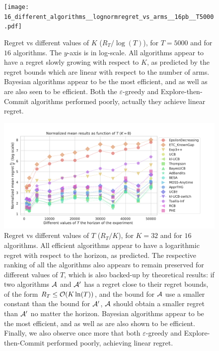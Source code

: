 \begin{figure}[h!]  %
	\texttt{[image: 16\_different\_algorithms\_\_lognormregret\_vs\_arms\_\_16pb\_\_T5000.pdf]}
	\caption[Regret vs different values of $K$.]{
        Regret vs different values of $K$ ($R_T / \log(T)$),
        for $T=5000$ and for $16$ algorithms.
        The $y$-axis is in log-scale.
        All algorithms appear to have a regret slowly growing with respect to $K$, as predicted by the regret bounds which are linear with respect to the number of arms.
        Bayesian algorithms appear to be the most efficient, and \klUCB{} as well as \UCB{} are also seen to be efficient.
        Both the $\varepsilon$-greedy and Explore-then-Commit algorithms performed poorly, actually they achieve linear regret.
	}
	\label{fig:3:16_different_algorithms__lognormregret_vs_arms__16pb__T5000}
\end{figure}

\begin{figure}[h!]  %
	\includegraphics[width=1.10\linewidth]{16_different_algorithms__lognormregret_vs_times__16pb__K8.pdf}
	\caption[Regret vs different values of $T$.]{
        Regret vs different values of $T$ ($R_T / K$),
        for $K=32$ and for $16$ algorithms.
        All efficient algorithms appear to have a logarithmic regret with respect to the horizon, as predicted.
        The respective ranking of all the algorithms also appears to remain preserved for different values of $T$, which is also backed-up by theoretical results: if two algorithms $\mathcal{A}$ and $\mathcal{A}'$ has a regret close to their regret bounds, of the form $R_T \leq \mathcal{O}(K \ln(T))$, and the bound for $\mathcal{A}$ use a smaller constant than the bound for $\mathcal{A}'$, $\mathcal{A}$ should obtain a smaller regret than $\mathcal{A}'$ no matter the horizon.
        Bayesian algorithms appear to be the most efficient, and \klUCB{} as well as \UCB{} are also shown to be efficient.
        Finally, we also observe once more that both $\varepsilon$-greedy and Explore-then-Commit performed poorly, achieving linear regret.
	}
	\label{fig:3:16_different_algorithms__lognormregret_vs_times__16pb__K8}
\end{figure}


